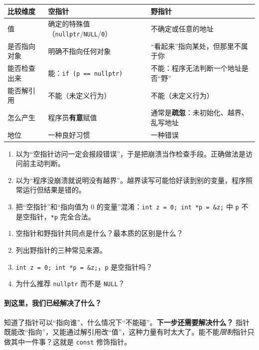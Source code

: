 \documentclass[UTF8,a4paper,11pt,fontset=none,zihao=-4]{ctexart}
\newcommand{\cc}[1]{\texttt{#1}}
\begin{document}
\begin{center}
\noindent\begin{tabularx}{\linewidth}{@{}p{2.3cm}YY@{}}
\toprule
{}比较维度 & 空指针 & 野指针 \\
\midrule
值 & 确定的特殊值（\cc{nullptr}/\cc{NULL}/\cc{0}） & 不确定或任意的地址 \\
是否指向对象 & 明确不指向任何对象 & “看起来”指向某处，但那里不属于你 \\
能否检查出来 & 能：\cc{if (p == nullptr)} & 不能：程序无法判断一个地址是否“野” \\
能否解引用 & 不能（未定义行为） & 不能（未定义行为） \\
怎么产生 & 程序员\textbf{有意}赋值 & 通常是\textbf{疏忽}：未初始化、越界、乱写地址 \\
地位 & 一种良好习惯 & 一种错误 \\
\bottomrule
\end{tabularx}
\end{center}

\begin{warningbox}
\begin{enumerate}
  \item 以为“空指针访问一定会报段错误”，于是把崩溃当作检查手段。正确做法是访问前主动判断。
  \item 以为“程序没崩溃就说明没有越界”。越界读写可能恰好读到别的变量，程序照常运行但结果是错的。
  \item 把“空指针”和“指向值为 0 的变量”混淆：\cc{int z = 0; int *p = \&z;} 中 \cc{p} 不是空指针，\cc{*p} 完全合法。
\end{enumerate}
\end{warningbox}

\begin{checkbox}
\begin{enumerate}[label=\arabic*.,itemsep=0pt]
  \item 空指针和野指针共同点是什么？最本质的区别是什么？
  \item 列出野指针的三种常见来源。
  \item \cc{int z = 0; int *p = \&z;}，\cc{p} 是空指针吗？
  \item 为什么推荐 \cc{nullptr} 而不是 \cc{NULL}？
\end{enumerate}
\end{checkbox}

\paragraph{到这里，我们已经解决了什么？} 知道了指针可以“指向谁”、什么情况下“不能碰”。\textbf{下一步还需要解决什么？} 指针既能改“指向”，又能通过解引用改“值”，这种力量有时太大了。能不能\emph{限制}指针只做其中一件事？这就是 \cc{const} 修饰指针。
\end{document}
